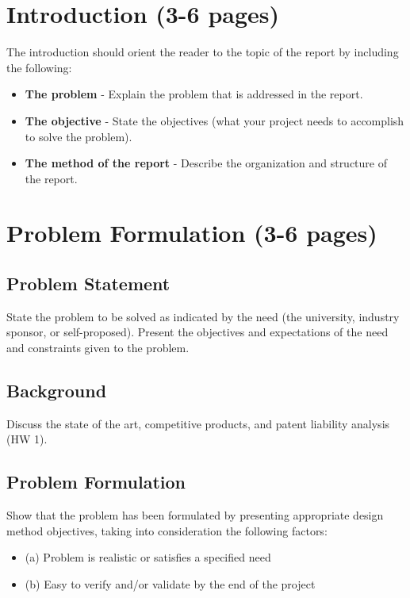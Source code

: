 \documentclass[12pt]{article}
\begin{document}
\section{Introduction (3-6 pages)}
The introduction should orient the reader to the topic of the report by including the following:
\begin{itemize}[noitemsep]
    \item \textbf{The problem} - Explain the problem that is addressed in the report.
    \item \textbf{The objective} - State the objectives (what your project needs to accomplish to solve the problem).
    \item \textbf{The method of the report} - Describe the organization and structure of the report.
\end{itemize}

\section{Problem Formulation (3-6 pages)}
\subsection{Problem Statement}
State the problem to be solved as indicated by the need (the university, industry sponsor, or self-proposed). Present the objectives and expectations of the need and constraints given to the problem.

\subsection{Background}
Discuss the state of the art, competitive products, and patent liability analysis (HW 1).

\subsection{Problem Formulation}
Show that the problem has been formulated by presenting appropriate design method objectives, taking into consideration the following factors:
\begin{itemize}[noitemsep]
    \item (a) Problem is realistic or satisfies a specified need
    \item (b) Easy to verify and/or validate by the end of the project
\end{itemize}
\end{document}

